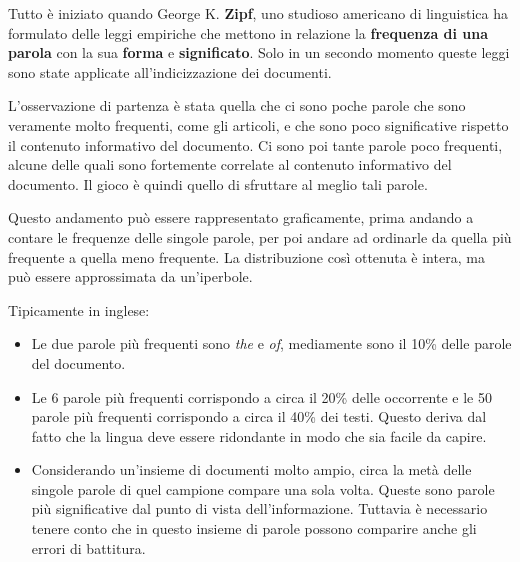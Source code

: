 


Tutto è iniziato quando George K. \textbf{Zipf}, uno studioso americano di linguistica ha formulato delle leggi empiriche che mettono in relazione la \textbf{frequenza di una parola} con la sua \textbf{forma} e \textbf{significato}. 
Solo in un secondo momento queste leggi sono state applicate all'indicizzazione dei documenti.

L'osservazione di partenza è stata quella che ci sono poche parole che sono veramente molto frequenti, come gli articoli, e che sono poco significative rispetto il contenuto informativo del documento. Ci sono poi tante parole poco frequenti, alcune delle quali sono fortemente correlate al contenuto informativo del documento. Il gioco è quindi quello di sfruttare al meglio tali parole.

Questo andamento può essere rappresentato graficamente, prima andando a contare le frequenze delle singole parole, per poi andare ad ordinarle da quella più frequente a quella meno frequente. La distribuzione così ottenuta è intera, ma può essere approssimata da un'iperbole.

Tipicamente in inglese:
\begin{itemize}
	\item Le due parole più frequenti sono \textit{the} e \textit{of}, mediamente sono il 10\% delle parole del documento.
	\item Le 6 parole più frequenti corrispondo a circa il 20\% delle occorrente e le 50 parole più frequenti corrispondo a circa il 40\% dei testi. Questo deriva dal fatto che la lingua deve essere ridondante in modo che sia facile da capire.
	\item Considerando un'insieme di documenti molto ampio, circa la metà delle singole parole di quel campione compare una sola volta. Queste sono parole più significative dal punto di vista dell'informazione. Tuttavia è necessario tenere conto che in questo insieme di parole possono comparire anche gli errori di battitura.
\end{itemize}

